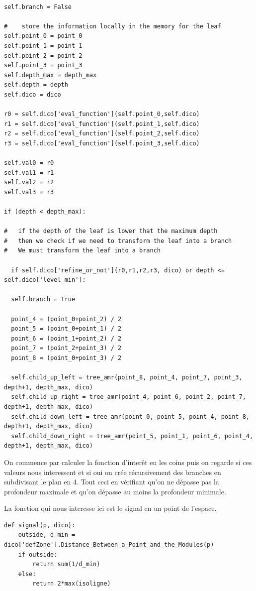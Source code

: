\documentclass[french]{article}
\begin{document}
\begin{verbatim}

self.branch = False

#    store the information locally in the memory for the leaf 
self.point_0 = point_0
self.point_1 = point_1
self.point_2 = point_2
self.point_3 = point_3
self.depth_max = depth_max
self.depth = depth
self.dico = dico

r0 = self.dico['eval_function'](self.point_0,self.dico)
r1 = self.dico['eval_function'](self.point_1,self.dico)
r2 = self.dico['eval_function'](self.point_2,self.dico)
r3 = self.dico['eval_function'](self.point_3,self.dico)

self.val0 = r0
self.val1 = r1
self.val2 = r2
self.val3 = r3

if (depth < depth_max):

#   if the depth of the leaf is lower that the maximum depth 
#   then we check if we need to transform the leaf into a branch
#   We must transform the leaf into a branch 

  if self.dico['refine_or_not'](r0,r1,r2,r3, dico) or depth <= self.dico['level_min']:

  self.branch = True

  point_4 = (point_0+point_2) / 2
  point_5 = (point_0+point_1) / 2
  point_6 = (point_1+point_2) / 2
  point_7 = (point_2+point_3) / 2
  point_8 = (point_0+point_3) / 2

  self.child_up_left = tree_amr(point_8, point_4, point_7, point_3, depth+1, depth_max, dico)
  self.child_up_right = tree_amr(point_4, point_6, point_2, point_7, depth+1, depth_max, dico)
  self.child_down_left = tree_amr(point_0, point_5, point_4, point_8, depth+1, depth_max, dico)
  self.child_down_right = tree_amr(point_5, point_1, point_6, point_4, depth+1, depth_max, dico)

\end{verbatim}

On commence par calculer la fonction d'interêt en les coins puis on regarde si ces valeurs nous interessent
et si oui on crée récursivement des branches en subdivisant le plan en 4. Tout ceci en vérifiant qu'on ne
dépasse pas la profondeur maximale et qu'on dépasse au moins la profondeur minimale.

La fonction qui nous interesse ici est le signal en un point de l'espace. 

\begin{verbatim}
def signal(p, dico):
    outside, d_min = dico['defZone'].Distance_Between_a_Point_and_the_Modules(p)
	if outside:
		return sum(1/d_min)
	else:
		return 2*max(isoligne)
\end{verbatim}
\end{document}

